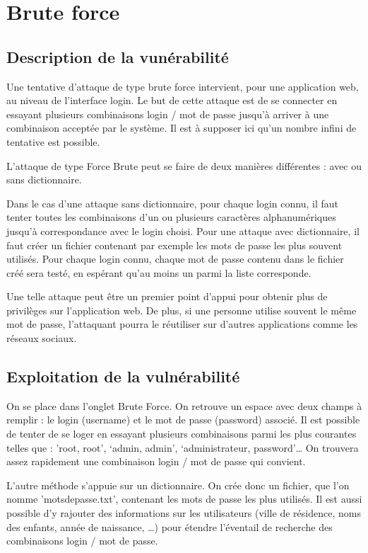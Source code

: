 \newpage

\section{Brute force}

\subsection{Description de la vunérabilité}

Une tentative d’attaque de type brute force intervient, pour une application web, au niveau de l’interface login. Le but de cette attaque est de se connecter en essayant plusieurs combinaisons login / mot de passe jusqu’à arriver à une combinaison acceptée par le système. Il est à supposer ici qu’un nombre infini de tentative est possible.

L’attaque de type Force Brute peut se faire de deux manières différentes : avec ou sans dictionnaire. 

Dans le cas d’une attaque sans dictionnaire, pour chaque login connu, il faut tenter toutes les combinaisons d’un ou plusieurs caractères alphanumériques jusqu’à correspondance avec le login choisi.
Pour une attaque avec dictionnaire, il faut créer un fichier contenant par exemple les mots de passe les plus souvent utilisés. Pour chaque login connu, chaque mot de passe contenu dans le fichier créé sera testé, en espérant qu’au moins un parmi la liste corresponde.

Une telle attaque peut être un premier point d’appui pour obtenir plus de privilèges sur l’application web. De plus, si une personne utilise souvent le même mot de passe, l’attaquant pourra le réutiliser sur d’autres applications comme les réseaux sociaux.


\subsection{Exploitation de la vulnérabilité}

On se place dans l’onglet Brute Force. On retrouve un espace avec deux champs à remplir : le login (username) et le mot de passe (password) associé. Il est possible de tenter de se loger en essayant plusieurs combinaisons parmi les plus courantes telles que : 'root, root', `admin, admin', `administrateur, password'… On trouvera assez rapidement une combinaison login / mot de passe qui convient.

L’autre méthode s’appuie sur un dictionnaire. On crée donc un fichier, que l’on nomme 'motsdepasse.txt', contenant les mots de passe les plus utilisés. Il est aussi possible d’y rajouter des informations sur les utilisateurs (ville de résidence, noms des enfants, année de naissance, …) pour étendre l’éventail de recherche des combinaisons login / mot de passe.

